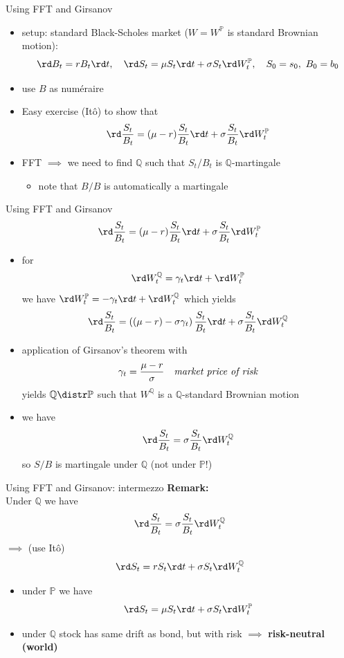 \documentclass[pdf, handout]{beamer}
\begin{document}
\begin{frame}{Using FFT and Girsanov}
\begin{itemize}
\item setup: standard Black-Scholes market ($W=W^{\mathbb{P}}$ is standard Brownian motion):
\[
\rd B_t = rB_t\rd t,\quad \rd S_t= \mu S_t\rd t +\sigma S_t \rd W_t^{\mathbb{P}},
\quad S_0=s_0,\,\,B_0=b_0
\]
\item use $B$ as num\'{e}raire
\item
Easy exercise (It\^o) to show that
\[
\rd \frac{S_t}{B_t} =(\mu -r) \frac{S_t}{B_t} \rd t + \sigma \frac{S_t}{B_t} \rd W_t^{\mathbb{P}}
\]
\item FFT $\implies$ we need to find $\mathbb{Q}$ such that $S_t/B_t$ is 
$\mathbb{Q}$-martingale
\begin{itemize}
\item note that $B/B$ is automatically a martingale
\end{itemize}
\end{itemize}
\end{frame}

\begin{frame}{Using FFT and Girsanov}
\[
\rd \frac{S_t}{B_t} =(\mu -r) \frac{S_t}{B_t} \rd t + \sigma \frac{S_t}{B_t} \rd W_t^{\mathbb{P}}
\]
\begin{itemize}
\item for
\[
\rd W^{\mathbb{Q}}_t=\gamma_t \rd t + \rd W^{\mathbb{P}}_t
\]
we have $\rd W^{\mathbb{P}}_t = -\gamma_t \rd t + \rd W^{\mathbb{Q}}_t$ which yields
\[
\rd \frac{S_t}{B_t} =\left((\mu -r)-\sigma \gamma_t \right) \frac{S_t}{B_t} \rd t + \sigma \frac{S_t}{B_t} \rd W_t^{\mathbb{Q}}
\]
\item application of Girsanov's theorem with
\[
\gamma_t=\frac{\mu-r}{\sigma}\quad \text{\emph{market price of risk}}
\]
yields $\mathbb{Q}\distr\mathbb{P}$ such that
$W^{\mathbb{Q}}$ is a $\mathbb{Q}$-standard Brownian motion
\item  we have
\[
\rd \frac{S_t}{B_t} = \sigma \frac{S_t}{B_t} \rd W_t^{\mathbb{Q}}
\]
so $S/B$ is martingale under $\mathbb{Q}$ (not under $\mathbb{P}$!)
\end{itemize}
\end{frame}

\begin{frame}{Using FFT and Girsanov: intermezzo}
\textbf{Remark:} \\
Under $\mathbb{Q}$ we have
\[
\rd \frac{S_t}{B_t}=\sigma \frac{S_t}{B_t} \rd W_t^{\mathbb{Q}}
\]
$\implies$ (use It\^o)
\[
\rd S_t= rS_t \rd t + \sigma S_t \rd W_t^{\mathbb{Q}}
\]
\begin{itemize}
\item
 under $\mathbb{P}$ we have
\[
\rd S_t= \mu S_t \rd t + \sigma S_t \rd W_t^{\mathbb{P}}
\]
\item under $\mathbb{Q}$ stock has same drift as bond, but with risk $\implies$ \textbf{risk-neutral (world)}
\end{itemize}
\end{frame}
\end{document}
